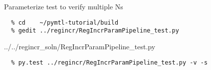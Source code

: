 \begin{task}\begin{frame}[fragile]{Parameterize test to verify multiple Ns}
\vspace{-0.25in}
\begin{verbatim}
  % cd    ~/pymtl-tutorial/build
  % gedit ../regincr/RegIncrParamPipeline_test.py
\end{verbatim}

\vspace{-0.3in}
%
{../../regincr_soln/RegIncrParamPipeline_test.py}

\vspace{-0.3in}
\begin{verbatim}
  % py.test ../regincr/RegIncrParamPipeline_test.py -v -s
\end{verbatim}
\end{frame}
\end{task}

